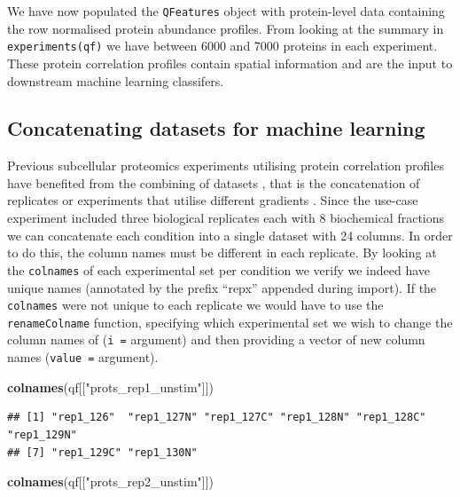\documentclass[9pt,a4paper,]{extarticle}
\newenvironment{Shaded}{\begin{snugshade}}{\end{snugshade}}
\newcommand{\FunctionTok}[1]{\textcolor[rgb]{0.13,0.29,0.53}{\textbf{#1}}}
\newcommand{\NormalTok}[1]{#1}
\newcommand{\StringTok}[1]{\textcolor[rgb]{0.31,0.60,0.02}{#1}}
\begin{document}
We have now populated the \texttt{QFeatures} object with protein-level data containing
the row normalised protein abundance profiles. From looking at the summary in
\texttt{experiments(qf)} we have between 6000 and 7000 proteins in each experiment.
These protein correlation profiles contain spatial information and are the input
to downstream machine learning classifers.

\subsection{Concatenating datasets for machine learning}\label{concatenating-datasets-for-machine-learning}

Previous subcellular proteomics experiments utilising protein correlation profiles
have benefited from the combining of datasets \citep{Barylyuk2020, Christoforou2016, Moloney2023},
that is the concatenation of replicates or experiments that utilise different
gradients \citep{Trotter2010}. Since the use-case experiment included three
biological replicates each with 8 biochemical fractions we can concatenate each
condition into a single dataset with 24 columns. In order to do this, the column
names must be different in each replicate. By looking at the \texttt{colnames} of each
experimental set per condition we verify we indeed have unique names (annotated
by the prefix ``repx'' appended during import). If the \texttt{colnames} were not unique
to each replicate we would have to use the \texttt{renameColname} function, specifying
which experimental set we wish to change the column names of (\texttt{i\ =} argument)
and then providing a vector of new column names (\texttt{value\ =} argument).

\begin{Shaded}
\begin{Highlighting}[]
\FunctionTok{colnames}\NormalTok{(qf[[}\StringTok{"prots\_rep1\_unstim"}\NormalTok{]])}
\end{Highlighting}
\end{Shaded}

\begin{verbatim}
## [1] "rep1_126"  "rep1_127N" "rep1_127C" "rep1_128N" "rep1_128C" "rep1_129N"
## [7] "rep1_129C" "rep1_130N"
\end{verbatim}

\begin{Shaded}
\begin{Highlighting}[]
\FunctionTok{colnames}\NormalTok{(qf[[}\StringTok{"prots\_rep2\_unstim"}\NormalTok{]])}
\end{Highlighting}
\end{Shaded}
\end{document}
